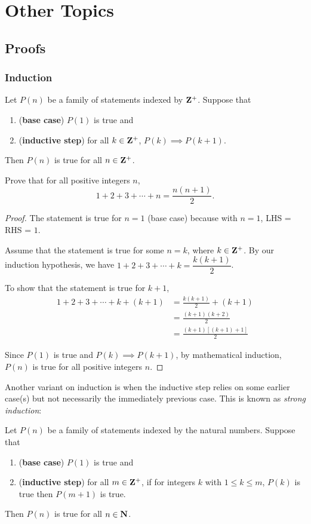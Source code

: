 \part{Other Topics}
\chapter{Proofs}
\section{Induction}
\begin{theorem}
Let $P(n)$ be a family of statements indexed by $\mathbf Z^+$. Suppose that 
\begin{enumerate}[label=(\roman*)]
\item (\textbf{base case}) $P(1)$ is true and
\item (\textbf{inductive step}) for all $k\in\mathbf Z^+$, $P(k)\implies P(k+1)$.
\end{enumerate}
Then $P(n)$ is true for all $n\in\mathbf Z^+$.
\end{theorem}

\begin{exercise}
Prove that for all positive integers $n$,
\[ 1+2+3+\cdots+n=\frac{n(n+1)}{2}. \]
\end{exercise}
\begin{proof}
The statement is true for $n=1$ (base case) because with $n=1$, LHS = RHS = $1$.

Assume that the statement is true for some $n=k$, where $k \in \mathbf Z^{+}$. By our induction hypothesis, we have $1 + 2 + 3 + \cdots + k = \dfrac{k(k+1)}{2}$.

To show that the statement is true for $k+1$, 
\begin{align*}
1 + 2 + 3 + \cdots + k + (k+1) &= \frac{k(k+1)}{2} + (k+1)\\
&= \frac{(k+1)(k+2)}{2}\\
&= \frac{(k+1)[(k+1)+1]}{2}
\end{align*}

Since $P(1)$ is true and $P(k)\implies P(k+1)$, by mathematical induction, $P(n)$ is true for all positive integers $n$.
\end{proof}

Another variant on induction is when the inductive step relies on some earlier case(s) but not necessarily the immediately previous case. This is known as \emph{strong induction}:

\begin{theorem}
Let $P(n)$ be a family of statements indexed by the natural numbers. Suppose that
\begin{enumerate}[label=(\roman*)]
\item (\textbf{base case}) $P(1)$ is true and
\item (\textbf{inductive step}) for all $m \in \mathbf Z^+$, if for integers $k$ with $1 \le k \le m$, $P(k)$ is true then $P(m+1)$ is true.
\end{enumerate}
Then $P(n)$ is true for all $n \in \mathbf N$.
\end{theorem}

